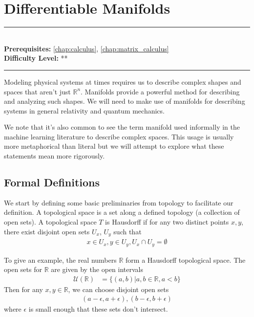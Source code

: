\documentclass[book.tex]{subfiles}
\begin{document}
\chapter{Differentiable Manifolds}
\label{chap:manifold}
\noindent\rule{11cm}{0.4pt} \\
\textbf{Prerequisites:} \autoref{chap:calculus}, \autoref{chap:matrix_calculus}{} \\
\textbf{Difficulty Level:} ** \\
\noindent\rule{11cm}{0.4pt}
\vspace{5mm}

Modeling physical systems at times requires us to describe complex shapes and spaces that aren't just $\mathbb{R}^n$. Manifolds provide a powerful method for describing and analyzing such shapes. We will need to make use of manifolds for describing systems in general relativity and quantum mechanics. 

We note that it's also common to see the term manifold used informally in the machine learning literature to describe complex spaces. This usage is usually more metaphorical than literal but we will attempt to explore what these statements mean more rigorously.

\section{Formal Definitions}

We start by defining some basic preliminaries from topology to facilitate our definition. A topological space is a set along a defined topology (a collection of open sets).
A topological space $T$ is Hausdorff if for any two distinct points $x, y$, there exist disjoint open sets $U_x$, $U_y$ such that 
\begin{align}
x \in U_x, y \in U_y, U_x \cap U_y = \emptyset\end{align}

To give an example, the real numbers $\mathbb{R}$ form a Hausdorff topological space. The open sets for $\mathbb{R}$ are given by the open intervals
\begin{align}
    \mathcal{U}(\mathbb{R}) &= \{ (a, b) | a, b\in \mathbb{R}, a < b \}
\end{align}
Then for any $x, y \in \mathbb{R}$, we can choose disjoint open sets
\begin{align}
    (a-\epsilon, a+\epsilon), (b-\epsilon, b+\epsilon)
\end{align}
where $\epsilon$ is small enough that these sets don't intersect.
\end{document}
